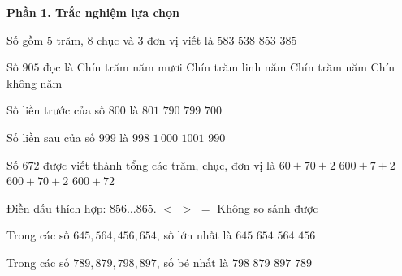 \textbf{Phần 1. Trắc nghiệm lựa chọn}

\begin{ex} %
Số gồm $5$ trăm, $8$ chục và $3$ đơn vị viết là
\choice
{\True $583$}
{$538$}
{$853$}
{$385$}
\end{ex}

\begin{ex} %
Số $905$ đọc là
\choice
{Chín trăm năm mươi}
{\True Chín trăm linh năm}
{Chín trăm năm}
{Chín không năm}
\end{ex}

\begin{ex} %
Số liền trước của số $800$ là
\choice
{$801$}
{$790$}
{\True $799$}
{$700$}
\end{ex}

\begin{ex} %
Số liền sau của số $999$ là
\choice
{$998$}
{\True $1\,000$}
{$1001$}
{$990$}
\end{ex}

\begin{ex} %
Số $672$ được viết thành tổng các trăm, chục, đơn vị là
\choice
{$60 + 70 + 2$}
{$600 + 7 + 2$}
{\True $600 + 70 + 2$}
{$600 + 72$}
\end{ex}

\begin{ex} %
Điền dấu thích hợp: $856 \dots 865$.
\choice
{\True $<$}
{$>$}
{$=$}
{Không so sánh được}
\end{ex}

\begin{ex} %
Trong các số $645, 564, 456, 654$, số lớn nhất là
\choice
{$645$}
{\True $654$}
{$564$}
{$456$}
\end{ex}

\begin{ex} %
Trong các số $789, 879, 798, 897$, số bé nhất là
\choice
{$798$}
{$879$}
{$897$}
{\True $789$}
\end{ex}

